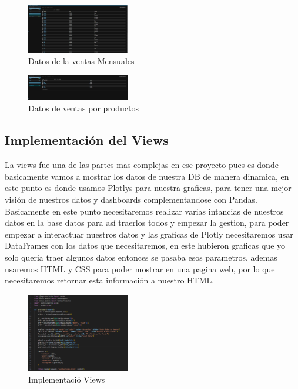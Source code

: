 \documentclass[conference]{IEEEtran}
\begin{document}
\begin{figure}[h] %
    \centering
    \includegraphics[width=0.4\textwidth]{images/Sells.png} %
    \caption{Datos de la ventas Mensuales }
    \label{fig:mi_imagen}
\end{figure}
\begin{figure}[h] %
    \centering
    \includegraphics[width=0.4\textwidth]{images/Ventas.png} %
    \caption{Datos de ventas por productos}
    \label{fig:mi_imagen}
\end{figure}



\subsection{Implementación del Views}

La views fue una de las partes mas complejas en ese proyecto pues es donde basicamente vamos a mostrar los datos de nuestra DB de manera dinamica, en este punto es donde usamos Plotlys para nuestra graficas, para tener una mejor visión de nuestros datos y dashboards complementandose con Pandas.
Basicamente en este punto necesitaremos realizar varias intancias de nuestros datos en la base datos para así traerlos todos y empezar la gestion, para poder empezar a interactuar nuestros datos y las graficas de Plotly necesitaremos usar DataFrames con los datos que necesitaremos, en este hubieron graficas que yo solo queria traer algunos datos entonces se pasaba esos parametros, ademas usaremos HTML y CSS para poder mostrar en una pagina web, por lo que necesitaremos retornar esta información a nuestro HTML.

\begin{figure}[h] %
    \centering
    \includegraphics[width=0.4\textwidth]{images/views.png} %
    \caption{Implementació Views}
    \label{fig:mi_imagen}
\end{figure}
\end{document}
